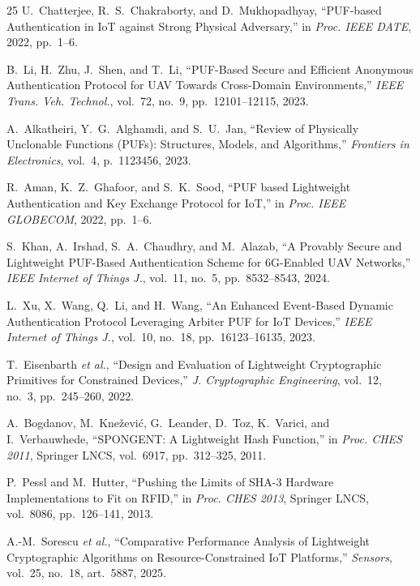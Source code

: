 \documentclass[11pt,a4paper]{article}
\begin{document}
\begin{thebibliography}{25}
U.~Chatterjee, R.~S.~Chakraborty, and D.~Mukhopadhyay, ``PUF-based Authentication in IoT against Strong Physical Adversary,'' in \textit{Proc. IEEE DATE}, 2022, pp.~1--6.

B.~Li, H.~Zhu, J.~Shen, and T.~Li, ``PUF-Based Secure and Efficient Anonymous Authentication Protocol for UAV Towards Cross-Domain Environments,'' \textit{IEEE Trans. Veh. Technol.}, vol.~72, no.~9, pp.~12101--12115, 2023.

A.~Alkatheiri, Y.~G.~Alghamdi, and S.~U.~Jan, ``Review of Physically Unclonable Functions (PUFs): Structures, Models, and Algorithms,'' \textit{Frontiers in Electronics}, vol.~4, p.~1123456, 2023.

R.~Aman, K.~Z.~Ghafoor, and S.~K.~Sood, ``PUF based Lightweight Authentication and Key Exchange Protocol for IoT,'' in \textit{Proc. IEEE GLOBECOM}, 2022, pp.~1--6.

S.~Khan, A.~Irshad, S.~A.~Chaudhry, and M.~Alazab, ``A Provably Secure and Lightweight PUF-Based Authentication Scheme for 6G-Enabled UAV Networks,'' \textit{IEEE Internet of Things J.}, vol.~11, no.~5, pp.~8532--8543, 2024.

L.~Xu, X.~Wang, Q.~Li, and H.~Wang, ``An Enhanced Event-Based Dynamic Authentication Protocol Leveraging Arbiter PUF for IoT Devices,'' \textit{IEEE Internet of Things J.}, vol.~10, no.~18, pp.~16123--16135, 2023.

T.~Eisenbarth \textit{et al.}, ``Design and Evaluation of Lightweight Cryptographic Primitives for Constrained Devices,'' \textit{J. Cryptographic Engineering}, vol.~12, no.~3, pp.~245--260, 2022.

A.~Bogdanov, M.~Kne\v{z}evi\'c, G.~Leander, D.~Toz, K.~Varici, and I.~Verbauwhede, ``SPONGENT: A Lightweight Hash Function,'' in \textit{Proc. CHES 2011}, Springer LNCS, vol.~6917, pp.~312--325, 2011.

P.~Pessl and M.~Hutter, ``Pushing the Limits of SHA-3 Hardware Implementations to Fit on RFID,'' in \textit{Proc. CHES 2013}, Springer LNCS, vol.~8086, pp.~126--141, 2013.

A.-M.~Sorescu \textit{et al.}, ``Comparative Performance Analysis of Lightweight Cryptographic Algorithms on Resource-Constrained IoT Platforms,'' \textit{Sensors}, vol.~25, no.~18, art.~5887, 2025.


\end{thebibliography}
\end{document}
